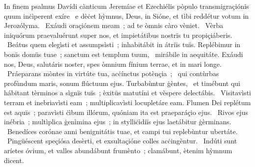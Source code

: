 { In finem psalmus Davídi cànticum Jeremíae et Ezechiélis pòpulo transmigraçiónis quum inċìperent exíre}
{%
~e dèċet hỳmnus, Deus, in Sióne, et tìbi reddétur votum in Jerozólyma. 
~Exáudi oraçiónem meam~; ad te òmnis càro vèniet. 
~Vèrba iniquórum praevaluérunt super nos, et impietátibus nostrïs tu propiçiáberis. 
~Beátus quem elegìsti et assumpsìsti~; inhabitábit in átriïs tuïs. Replébimur in bonïs domüs tuae~; sanctum est templum tuum, 
~mirábile in aequitáte. Exáudi nos, Deus, salutáris noster, spes òmnium fínium terrae, et in mari longe. 
~Práeparans mòntes in virtúte tua, acċínctus potènçia~; 
~qui contùrbas profùndum maris, sonum flúctuum ejus. Turbabùntur ġèntes, 
~et timébunt qui hábitant tèrminos a sìgnïs tuïs~; èxitüs matutíni et vèspere delectábis. 
~Visitavìsti terram et inebriavìsti eam~; multiplicavìsti locupletáre eam. Flumen Dei replétum est aquïs~; paravìsti ċìbum illórum, quóniam ita est praeparáçio ejus. 
~Rivos ejus inébria~; multìplica ġenìmina ejus~; in stylliċìdiïs ejus laetábitur ġèrminans. 
~Benedíces corónae anni benignitátis tuae, et campi tui replebùntur ubertáte. 
~Pingüéscent speçiósa desèrti, et exsultaçióne colles acċingèntur. 
~Indúti sunt aríetes óvium, et valles abundábunt frumènto~; clamábunt, ètenim hỳmnum dicent. 
}
